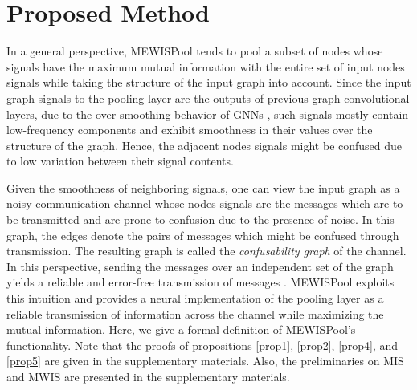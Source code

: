 \documentclass{article}
\begin{document}
\section{Proposed Method}
\label{sec:prop_met}
In a general perspective, MEWISPool tends to pool a subset of nodes whose signals have the maximum mutual information with the entire set of input nodes signals while taking the structure of the input graph into account. Since the input graph signals to the pooling layer are the outputs of previous graph convolutional layers, due to the over-smoothing behavior of GNNs  \cite{lowpass, fastgcn, oversmoothing, oversmoothing2, pairnorm}, such signals mostly contain low-frequency components and exhibit smoothness in their values over the structure of the graph. Hence, the adjacent nodes signals might be confused due to low variation between their signal contents. 

Given the smoothness of neighboring signals, one can view the input graph as a noisy communication channel whose nodes signals are the messages which are to be transmitted and are prone to confusion due to the presence of noise. In this graph, the edges denote the pairs of messages which might be confused through transmission. 
The resulting graph is called the \textit{confusability graph} \cite{confusability} of the channel. In this perspective, sending the messages over an independent set of the graph yields a reliable and error-free transmission of messages \cite{shannon}. MEWISPool exploits this intuition and provides a neural implementation of the pooling layer as a reliable transmission of information across the channel while maximizing the mutual information. Here, we give a formal definition of MEWISPool's functionality. Note that the proofs of propositions \ref{prop1}, \ref{prop2}, \ref{prop4}, and \ref{prop5} are given in the supplementary materials. Also, the preliminaries on MIS and MWIS are presented in the supplementary materials.
\end{document}
